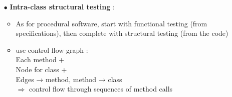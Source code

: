 \documentclass{article}
\begin{document}
\begin{multicols}{2}
\begin{itemize}
    \item [$\bullet$]\textbf{Intra-class structural testing} :
    \begin{itemize}
        \item As for procedural software, start with functional testing (from specifications), then complete with
structural testing (from the code)
        \item use control flow graph :\\
        Each method +\\
        Node for class +\\
        Edges → method, method → class\\ $\Rightarrow$ control flow through sequences of method calls
    \end{itemize}
\end{itemize}
\vfill\null
\end{multicols}
\vspace{-0.5cm}
\end{document}
